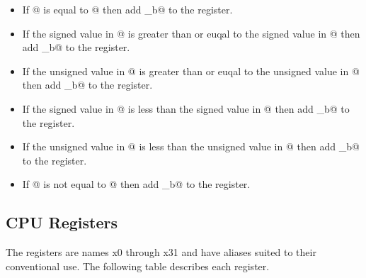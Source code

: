 \begin{itemize}
\item{}
\label{insn:beq}

If @ is equal to @ then add \verb@imm_b@ to the 
\verb@pc@ register.

\item{}
\label{insn:bge}

If the signed value in @ is greater than or euqal to the 
signed value in @ then add \verb@imm_b@ to the 
\verb@pc@ register.

\item{}
\label{insn:bgeu}

If the unsigned value in @ is greater than or euqal to the 
unsigned value in @ then add \verb@imm_b@ to the 
\verb@pc@ register.

\item{}
\label{insn:blt}

If the signed value in @ is less than the 
signed value in @ then add \verb@imm_b@ to the 
\verb@pc@ register.

\item{}
\label{insn:bltu}

If the unsigned value in @ is less than the 
unsigned value in @ then add \verb@imm_b@ to the 
\verb@pc@ register.

\item{}
\label{insn:bne}

If @ is not equal to @ then add \verb@imm_b@ to the 
\verb@pc@ register.

\end{itemize}



\subsection{CPU Registers}
\label{cpuregs}

The registers are names x0 through x31 and have aliases suited to their 
conventional use.  The following table describes each register.  

